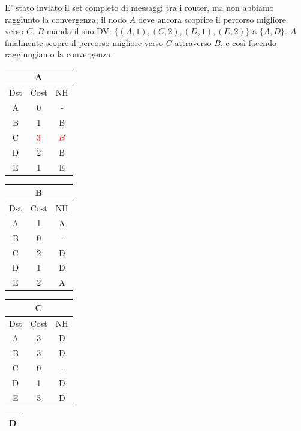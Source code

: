 \documentclass[10pt]{article}
\begin{document}
	\newline \newline
	E' stato inviato il set completo di messaggi tra i router, ma non abbiamo raggiunto la convergenza; il nodo $A$ deve ancora scoprire il percorso migliore verso $C$.
	\newline \newline
	$B$ manda il suo DV: $\{(A,1),(C,2),(D,1),(E,2)\}$ a $\{A,D\}$.
	\newline
	$A$ finalmente scopre il percorso migliore verso $C$ attraverso $B$, e così facendo raggiungiamo la convergenza.
	\begin{table}[h!]
		\begin{tabular}{|c||c||c|}
 			\hline
	 		\multicolumn{3}{|c|}{A} \\
 			\hline
 			Dst & Cost & NH\\
 			\hline
 			A & 0 & - \\
 			B & 1 & B \\
 			C & $\color{red} 3$ & $\color{red} B$ \\
 			D & 2 & B \\
 			E & 1 & E \\
 			\hline
		\end{tabular}
		\begin{tabular}{|c||c||c|}
 			\hline
	 		\multicolumn{3}{|c|}{B} \\
 			\hline
 			Dst & Cost & NH\\
 			\hline
 			A & 1 & A \\
 			B & 0 & - \\
 			C & 2 & D \\
 			D & 1 & D \\
 			E & 2 & A \\
 			\hline
		\end{tabular}
		\begin{tabular}{|c||c||c|}
 			\hline
	 		\multicolumn{3}{|c|}{C} \\
 			\hline
 			Dst & Cost & NH\\
 			\hline
 			A & 3 & D \\
 			B &3 & D \\
 			C & 0 & - \\
 			D & 1 & D \\
 			E & 3 & D \\
 			\hline
		\end{tabular}
		\begin{tabular}{|c||c||c|}
 			\hline
	 		\multicolumn{3}{|c|}{D} \\
 			\hline

\end{tabular}
\end{table}
\end{document}
